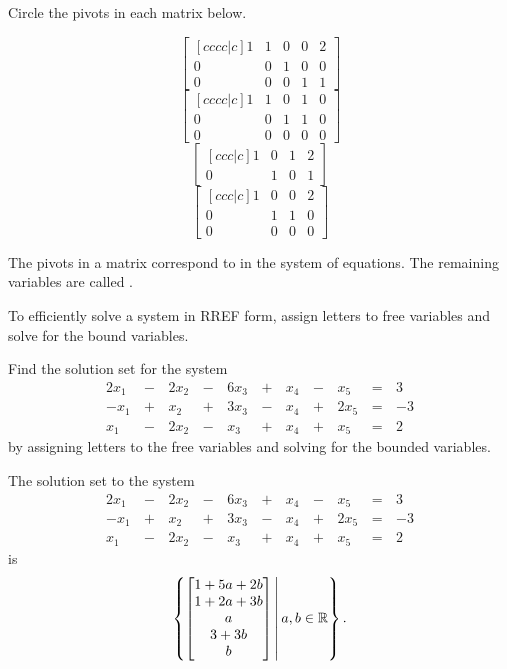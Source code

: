 \begin{applicationActivities}{2}{4}
\begin{activity}{5}
Circle the pivots in each matrix below.
\begin{multicols}{2}
\[ \begin{bmatrix}[cccc|c] 1 & 1 & 0 & 0 & 2 \\ 0 & 0 & 1 & 0 &  0 \\ 0 & 0 & 0 &  1 & 1 \end{bmatrix} \]
\[ \begin{bmatrix}[cccc|c] 1 & 1 & 0 & 1 & 0 \\ 0 & 0 & 1 & 1 & 0 \\ 0 & 0 & 0 & 0  & 0 \end{bmatrix} \]
\[ \begin{bmatrix}[ccc|c] 1 & 0 & 1 & 2 \\ 0 & 1 & 0 & 1 \end{bmatrix} \]
\[ \begin{bmatrix}[ccc|c] 1 & 0 & 0 & 2 \\ 0 & 1 & 1 & 0 \\ 0 & 0 & 0 & 0 \end{bmatrix} \]
\end{multicols}
\end{activity}

\begin{definition}
The pivots in a matrix correspond to  in the system of equations.  The remaining variables are called .

To efficiently solve a system in RREF form, assign letters to free variables and solve for the bound variables.
\end{definition}

\begin{activity}{10}
Find the solution set for the system
\begin{alignat*}{6}
2x_1&\,-\,&2x_2&\,-\,&6x_3&\,+\,&x_4&\,-\,&x_5&\,=\,&3 \\
-x_1&\,+\,&x_2&\,+\,&3x_3&\,-\,&x_4&\,+\,&2x_5 &\,=\,& -3 \\
x_1&\,-\,&2x_2&\,-\,&x_3&\,+\,&x_4&\,+\,&x_5 &\,=\,& 2
\end{alignat*}
by assigning letters to the free variables and solving for the bounded variables. 
\end{activity}

\begin{observation}
The solution set to the system
\begin{alignat*}{6}
2x_1&\,-\,&2x_2&\,-\,&6x_3&\,+\,&x_4&\,-\,&x_5&\,=\,&3 \\
-x_1&\,+\,&x_2&\,+\,&3x_3&\,-\,&x_4&\,+\,&2x_5 &\,=\,& -3 \\
x_1&\,-\,&2x_2&\,-\,&x_3&\,+\,&x_4&\,+\,&x_5 &\,=\,& 2
\end{alignat*}
is \[\left\{ \begin{bmatrix} 1+5a+2b \\ 1+2a+3b \\ a \\3+3b \\ b \end{bmatrix}\,\middle|\, a,b\in \mathbb{R}\right\}.\]
\end{observation}


\end{applicationActivities}
